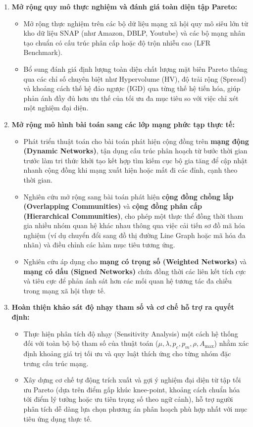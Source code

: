 \documentclass[14pt,a4paper]{extarticle}
\begin{document}
\begin{enumerate}
    \item \textbf{Mở rộng quy mô thực nghiệm và đánh giá toàn diện tập Pareto:}
    \begin{itemize}
        \item Mở rộng thực nghiệm trên các bộ dữ liệu mạng xã hội quy mô siêu lớn từ kho dữ liệu SNAP (như Amazon, DBLP, Youtube) và các bộ mạng nhân tạo chuẩn có cấu trúc phân cấp hoặc độ trộn nhiễu cao (LFR Benchmark).
        \item Bổ sung đánh giá định lượng toàn diện chất lượng mặt biên Pareto thông qua các chỉ số chuyên biệt như $\text{Hypervolume}$ (HV), độ trải rộng (Spread) và khoảng cách thế hệ đảo ngược (IGD) qua từng thế hệ tiến hóa, giúp phản ánh đầy đủ hơn ưu thế của tối ưu đa mục tiêu so với việc chỉ xét một nghiệm đại diện.
    \end{itemize}

    \item \textbf{Mở rộng mô hình bài toán sang các lớp mạng phức tạp thực tế:}
    \begin{itemize}
        \item Phát triển thuật toán cho bài toán phát hiện cộng đồng trên \textbf{mạng động (Dynamic Networks)}, tận dụng cấu trúc phân hoạch từ bước thời gian trước làm tri thức khởi tạo kết hợp tìm kiếm cục bộ gia tăng để cập nhật nhanh cộng đồng khi mạng xuất hiện hoặc mất đi các đỉnh, cạnh theo thời gian.
        \item Nghiên cứu mở rộng sang bài toán phát hiện \textbf{cộng đồng chồng lấp (Overlapping Communities)} và \textbf{cộng đồng phân cấp (Hierarchical Communities)}, cho phép một thực thể đồng thời tham gia nhiều nhóm quan hệ khác nhau thông qua việc cải tiến sơ đồ mã hóa nghiệm (ví dụ chuyển đổi sang đồ thị đường Line Graph hoặc mã hóa đa nhãn) và điều chỉnh các hàm mục tiêu tương ứng.
        \item Nghiên cứu áp dụng cho \textbf{mạng có trọng số (Weighted Networks)} và \textbf{mạng có dấu (Signed Networks)} chứa đồng thời các liên kết tích cực và tiêu cực để phản ánh sát hơn các mối quan hệ tương tác đa chiều trong mạng xã hội thực tế.
    \end{itemize}

    \item \textbf{Hoàn thiện khảo sát độ nhạy tham số và cơ chế hỗ trợ ra quyết định:}
    \begin{itemize}
        \item Thực hiện phân tích độ nhạy (Sensitivity Analysis) một cách hệ thống đối với toàn bộ bộ tham số của thuật toán ($\mu, \lambda, p_c, p_m, \rho, A_{\max}$) nhằm xác định khoảng giá trị tối ưu và quy luật thích ứng cho từng nhóm đặc trưng cấu trúc mạng.
        \item Xây dựng cơ chế tự động trích xuất và gợi ý nghiệm đại diện từ tập tối ưu Pareto (dựa trên điểm gấp khúc knee-point, khoảng cách chuẩn hóa tới điểm lý tưởng hoặc ưu tiên trọng số theo ngữ cảnh), hỗ trợ người phân tích dễ dàng lựa chọn phương án phân hoạch phù hợp nhất với mục tiêu ứng dụng thực tế.
    \end{itemize}
\end{enumerate}
\end{document}
